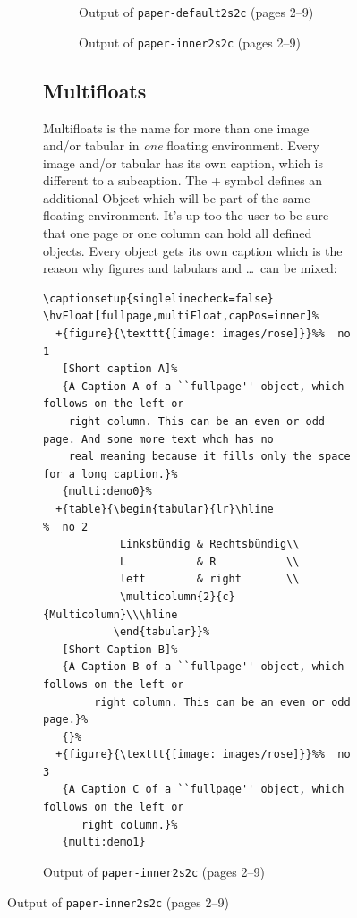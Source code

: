 \documentclass[twoside,paper=a4]{scrartcl}
\begin{document}
\begin{figure}[p]
\begin{figure}[p]
\begin{figure}
\caption{Output of \texttt{paper-default2s2c} (pages 2--9)}\label{paper-default2s2c}
\end{figure}


\begin{figure}
\hfill
{}\hfill
{}\hfill
{}

\hfill
{}\hfill
{}\hfill
{}

\caption{Output of \texttt{paper-inner2s2c} (pages 2--9)}\label{paper-inner2s2c}
\end{figure}


\FloatBarrier


\subsection{Multifloats}
Multifloats is the name for more than one image and/or tabular in \emph{one} floating
environment. Every image and/or tabular has its own caption, which is different to
a subcaption. 
The + symbol defines an additional Object which will be part of the same floating environment.
It's up too the user to be sure that one page or one column can hold all defined objects.
Every object gets its own caption which is the reason why figures and tabulars and \ldots\ 
can be mixed:

\begin{lstlisting}
\captionsetup{singlelinecheck=false}
\hvFloat[fullpage,multiFloat,capPos=inner]%
  +{figure}{\texttt{[image: images/rose]}}%%  no 1
   [Short caption A]%
   {A Caption A of a ``fullpage'' object, which follows on the left or
    right column. This can be an even or odd page. And some more text whch has no
    real meaning because it fills only the space for a long caption.}%
   {multi:demo0}%
  +{table}{\begin{tabular}{lr}\hline                 %  no 2
            Linksbündig & Rechtsbündig\\
            L           & R           \\
            left        & right       \\
            \multicolumn{2}{c}{Multicolumn}\\\hline
           \end{tabular}}%
   [Short Caption B]%
   {A Caption B of a ``fullpage'' object, which follows on the left or
        right column. This can be an even or odd page.}%
   {}%
  +{figure}{\texttt{[image: images/rose]}}%%  no 3
   {A Caption C of a ``fullpage'' object, which follows on the left or
      right column.}%
   {multi:demo1}
\end{lstlisting}




\end{figure}
\end{figure}
\end{document}
